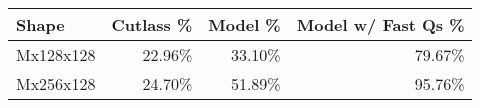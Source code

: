 \begin{tabular}{lrrr}
\textbf{Shape}                 & \multicolumn{1}{l}{\textbf{Cutlass \%}} & \multicolumn{1}{l}{\textbf{Model  \%}} & \multicolumn{1}{l}{\textbf{Model w/ Fast Qs \%}} \\ \hline
\multicolumn{1}{l|}{Mx128x128} & 22.96\%                                 & 33.10\%                                & 79.67\%                                          \\
\multicolumn{1}{l|}{Mx256x128} & 24.70\%                                 & 51.89\%                                & 95.76\%                                          \\ \hline
\end{tabular}
